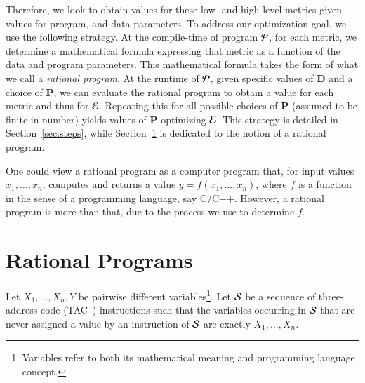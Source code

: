 Therefore, we look to obtain values for these low- and high-level metrics
given values for program, and data parameters.
To address our optimization goal, we  use the following strategy.
At the compile-time of program ${\cal P}$,  for each metric, 
we determine a mathematical formula expressing that metric as a  
function of the data and program parameters.
This mathematical formula takes the 
form of what we call a {\em rational program}.
At the runtime of ${\cal P}$, given specific values of ${\bm D}$
and a choice of ${\bm P}$, we can evaluate the rational program to
obtain a value for each metric and thus for ${\cal E}$.  Repeating
this for all possible choices of ${\bm P}$ (assumed to be finite
in number) yields values of ${\bm P}$
optimizing ${\cal E}$.  This strategy is detailed in
Section~\ref{sec:steps}, while Section~\ref{sect:ratprog} 
is dedicated to the notion of a rational program.

One could view a rational program as a computer program that,
for input values $x_1, \ldots, x_n$, computes and returns a value
$y = f(x_1, \ldots, x_n)$, where $f$ is a function in the sense of a
programming language, say C/C++.  However, a rational program is 
more than that, due to the process we use to determine $f$.



\section{Rational Programs}
\label{sect:ratprog}

Let $X_1, \ldots, X_n, Y$ be pairwise different
variables\footnote{Variables refer to both its mathematical meaning
  and programming language concept.}.  Let ${\cal S}$ be a sequence of
three-address code (TAC~\cite{Aho:1986:CPT:6448}) instructions such
that the variables occurring in ${\cal S}$ that are never
assigned a value by an instruction
of ${\cal S}$ are exactly $X_1, \ldots, X_n$.


